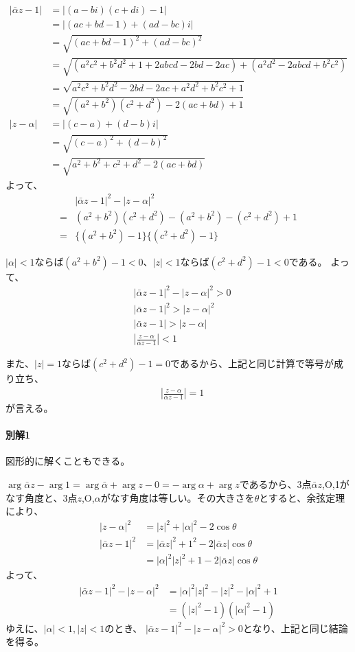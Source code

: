 \begin{align*}
    |\bar{\alpha}z-1|&=|(a-bi)(c+di)-1|\\
    &=|(ac+bd-1)+(ad-bc)i|\\
    &=\sqrt{(ac+bd-1)^2+(ad-bc)^2}\\
    &=\sqrt{(a^2c^2+b^2d^2+1+2abcd-2bd-2ac)+(a^2d^2-2abcd+b^2c^2)}\\
    &=\sqrt{a^2c^2+b^2d^2-2bd-2ac+a^2d^2+b^2c^2+1}\\
    &=\sqrt{(a^2+b^2)(c^2+d^2)-2(ac+bd)+1}\\
    |z-\alpha|&=|(c-a)+(d-b)i|\\
    &=\sqrt{(c-a)^2+(d-b)^2}\\
    &=\sqrt{a^2+b^2+c^2+d^2-2(ac+bd)}
\end{align*}
よって、
\begin{align*}
    &|\bar{\alpha}z-1|^2-|z-\alpha|^2\\
    =&(a^2+b^2)(c^2+d^2)-(a^2+b^2)-(c^2+d^2)+1\\
    =&\{(a^2+b^2)-1\}\{(c^2+d^2)-1\}
\end{align*}

$|\alpha|<1$ならば$(a^2+b^2)-1<0$、$|z|<1$ならば$(c^2+d^2)-1<0$である。
よって、
\begin{align*}
    &|\bar{\alpha}z-1|^2-|z-\alpha|^2>0\\
    &|\bar{\alpha}z-1|^2>|z-\alpha|^2\\
    &|\bar{\alpha}z-1|>|z-\alpha|\\
    &\left|\frac{z-\alpha}{\bar{\alpha}z-1}\right|<1
\end{align*}

また、$|z|=1$ならば$(c^2+d^2)-1=0$であるから、上記と同じ計算で等号が成り立ち、
\begin{align*}
    &\left|\frac{z-\alpha}{\bar{\alpha}z-1}\right|=1
\end{align*}
が言える。

\paragraph{別解1}

図形的に解くこともできる。

$\arg\bar{\alpha}z-\arg 1=\arg\bar{\alpha}+\arg z-0=-\arg\alpha+\arg z$であるから、3点$\bar{\alpha}z$,O,1がなす角度と、3点$z$,O,$\alpha$がなす角度は等しい。その大きさを$\theta$とすると、余弦定理により、
\begin{align*}
    |z-\alpha|^2&=|z|^2+|\alpha|^2-2\cos\theta\\
    |\bar{\alpha}z-1|^2&=|\bar{\alpha}z|^2+1^2-2|\bar{\alpha}z|\cos\theta\\
    &=|\alpha|^2|z|^2+1-2|\bar{\alpha}z|\cos\theta
\end{align*}
よって、
\begin{align*}
    |\bar{\alpha}z-1|^2-|z-\alpha|^2&=|\alpha|^2|z|^2-|z|^2-|\alpha|^2+1\\
    &=(|z|^2-1)(|\alpha|^2-1)
\end{align*}
ゆえに、$|\alpha|<1, |z|<1$のとき、 $|\bar{\alpha}z-1|^2-|z-\alpha|^2>0$となり、上記と同じ結論を得る。

